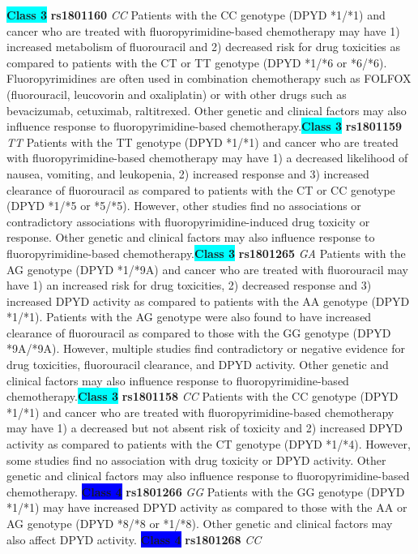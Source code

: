 \documentclass{book}
\begin{document}
\begin{center}
\textbf{\colorbox{cyan} {Class 3}} \textbf{ rs1801160 } \textit{ CC }
Patients with the CC genotype (DPYD *1/*1) and cancer who are treated with fluoropyrimidine-based chemotherapy may have 1) increased metabolism of fluorouracil and 2) decreased risk for drug toxicities as compared to patients with the CT or TT genotype (DPYD *1/*6 or *6/*6). Fluoropyrimidines are often used in combination chemotherapy such as FOLFOX (fluorouracil, leucovorin and oxaliplatin) or with other drugs such as bevacizumab, cetuximab, raltitrexed. Other genetic and clinical factors may also influence response to fluoropyrimidine-based chemotherapy.\textbf{\colorbox{cyan} {Class 3}} \textbf{ rs1801159 } \textit{ TT }
Patients with the TT genotype (DPYD *1/*1) and cancer who are treated with fluoropyrimidine-based chemotherapy may have 1) a decreased likelihood of nausea, vomiting, and leukopenia, 2) increased response and 3) increased clearance of fluorouracil as compared to patients with the CT or CC genotype (DPYD *1/*5 or *5/*5). However, other studies find no associations or contradictory associations with fluoropyrimidine-induced drug toxicity or response. Other genetic and clinical factors may also influence response to fluoropyrimidine-based chemotherapy.\textbf{\colorbox{cyan} {Class 3}} \textbf{ rs1801265 } \textit{ GA }
Patients with the AG genotype (DPYD *1/*9A) and cancer who are treated with fluorouracil may have 1) an increased risk for drug toxicities, 2) decreased response and 3) increased DPYD activity as compared to patients with the AA genotype (DPYD *1/*1). Patients with the AG genotype were also found to have increased clearance of fluorouracil as compared to those with the GG genotype (DPYD *9A/*9A). However, multiple studies find contradictory or negative evidence for drug toxicities, fluorouracil clearance, and DPYD activity. Other genetic and clinical factors may also influence response to fluoropyrimidine-based chemotherapy.\textbf{\colorbox{cyan} {Class 3}} \textbf{ rs1801158 } \textit{ CC }
Patients with the CC genotype (DPYD *1/*1) and cancer who are treated with fluoropyrimidine-based chemotherapy may have 1) a decreased but not absent risk of toxicity and 2) increased DPYD activity as compared to patients with the CT genotype (DPYD *1/*4). However, some studies find no association with drug toxicity or DPYD activity. Other genetic and clinical factors may also influence response to fluoropyrimidine-based chemotherapy.
\textbf{\colorbox{blue} {Class 4}} \textbf{ rs1801266 } \textit{ GG }
Patients with the GG genotype (DPYD *1/*1) may have increased DPYD activity as compared to those with the AA or AG genotype (DPYD *8/*8 or *1/*8). Other genetic and clinical factors may also affect DPYD activity. \textbf{\colorbox{blue} {Class 4}} \textbf{ rs1801268 } \textit{ CC }

\end{center}
\end{document}

